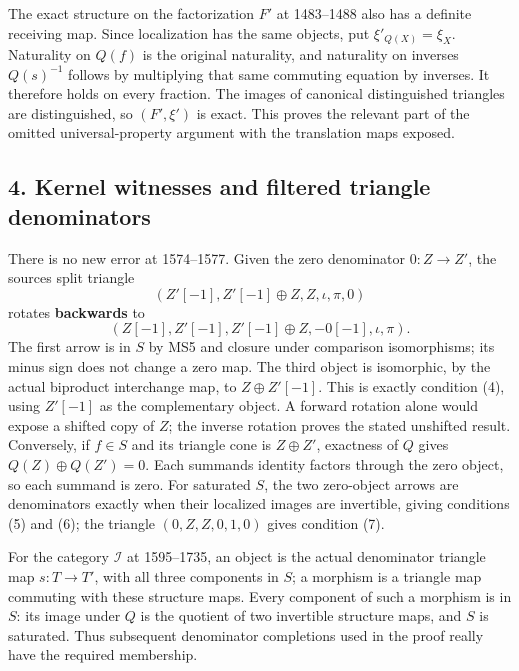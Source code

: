 \documentclass[11pt]{article}
\begin{document}
The exact structure on the factorization \(F'\) at 1483–\allowbreak{}1488 also has a definite receiving map. Since localization has the same objects,\allowbreak{} put \(\xi'_{Q(X)}=\xi_X\). Naturality on \(Q(f)\) is the original naturality,\allowbreak{} and naturality on inverses \(Q(s)^{-1}\) follows by multiplying that same commuting equation by inverses. It therefore holds on every fraction. The images of canonical distinguished triangles are distinguished,\allowbreak{} so \((F',\xi')\) is exact. This proves the relevant part of the omitted universal-property argument with the translation maps exposed.

\subsection{4. Kernel witnesses and filtered triangle denominators}\label{proofs-1149-1843-kernel-witnesses-and-filtered-triangle-denominators}

There is no new error at 1574–\allowbreak{}1577. Given the zero denominator \(0:Z\to Z'\),\allowbreak{} the source\textquotesingle s split triangle \[
(Z'[-1],Z'[-1]\oplus Z,Z,\iota,\pi,0)
\] rotates \textbf{backwards} to \[
(Z[-1],Z'[-1],Z'[-1]\oplus Z,-0[-1],\iota,\pi).
\] The first arrow is in \(S\) by MS5 and closure under comparison isomorphisms; its minus sign does not change a zero map. The third object is isomorphic,\allowbreak{} by the actual biproduct interchange map,\allowbreak{} to \(Z\oplus Z'[-1]\). This is exactly condition (4)\allowbreak{},\allowbreak{} using \(Z'[-1]\) as the complementary object. A forward rotation alone would expose a shifted copy of \(Z\); the inverse rotation proves the stated unshifted result. Conversely,\allowbreak{} if \(f\in S\) and its triangle cone is \(Z\oplus Z'\),\allowbreak{} exactness of \(Q\) gives \(Q(Z)\oplus Q(Z')=0\). Each summand\textquotesingle s identity factors through the zero object,\allowbreak{} so each summand is zero. For saturated \(S\),\allowbreak{} the two zero-object arrows are denominators exactly when their localized images are invertible,\allowbreak{} giving conditions (5)\allowbreak{} and (6)\allowbreak{}; the triangle \((0,Z,Z,0,1,0)\) gives condition (7)\allowbreak{}.

For the category \(\mathcal I\) at 1595–\allowbreak{}1735,\allowbreak{} an object is the actual denominator triangle map \(s:T\to T'\),\allowbreak{} with all three components in \(S\); a morphism is a triangle map commuting with these structure maps. Every component of such a morphism is in \(S\):\allowbreak{} its image under \(Q\) is the quotient of two invertible structure maps,\allowbreak{} and \(S\) is saturated. Thus subsequent denominator completions used in the proof really have the required membership.
\end{document}
